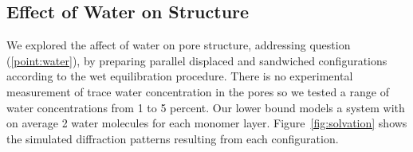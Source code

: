 \documentclass[journal=jpcbfk,manusciprt=article]{achemso}
\begin{document}
%

  \subsection{Effect of Water on Structure}

  We explored the affect of water on pore structure, addressing question
  (\ref{point:water}), by preparing parallel displaced and sandwiched
  configurations according to the wet equilibration procedure. There is no
  experimental measurement of trace water concentration in the pores so we tested
  a range of water concentrations from 1 to 5 percent. Our lower bound models a
  system with on average 2 water molecules for each monomer layer.
  Figure~\ref{fig:solvation} shows the simulated diffraction patterns resulting
  from each configuration.
\end{document}
